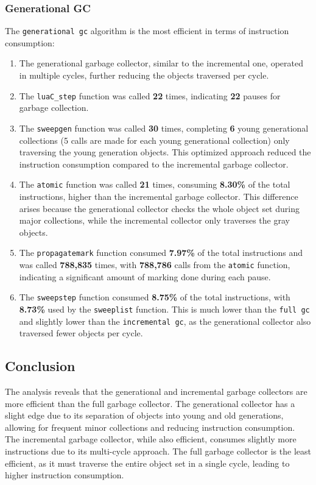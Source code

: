 \documentclass[10pt]{article}
\begin{document}
\subsubsection{Generational GC}
The \texttt{generational gc} algorithm is the most efficient in terms of instruction consumption:
\begin{enumerate}
    \item The generational garbage collector, similar to the incremental one, operated in multiple cycles, further reducing the objects traversed per cycle.
    \item The \texttt{luaC\_step} function was called \textbf{22} times, indicating \textbf{22} pauses for garbage collection.
    \item The \texttt{sweepgen} function was called \textbf{30} times, completing \textbf{6} young generational collections (5 calls are made for each young generational collection) only traversing the young generation objects. This optimized approach reduced the instruction consumption compared to the incremental garbage collector.
    \item The \texttt{atomic} function was called \textbf{21} times, consuming \textbf{8.30\%} of the total instructions, higher than the incremental garbage collector. This difference arises because the generational collector checks the whole object set during major collections, while the incremental collector only traverses the gray objects.
    \item The \texttt{propagatemark} function consumed \textbf{7.97\%} of the total instructions and was called \textbf{788,835} times, with \textbf{788,786} calls from the \texttt{atomic} function, indicating a significant amount of marking done during each pause.
    \item The \texttt{sweepstep} function consumed \textbf{8.75\%} of the total instructions, with \textbf{8.73\%} used by the \texttt{sweeplist} function. This is much lower than the \texttt{full gc} and slightly lower than the \texttt{incremental gc}, as the generational collector also traversed fewer objects per cycle.
\end{enumerate}

\subsection{Conclusion}
The analysis reveals that the generational and incremental garbage collectors are more efficient than the full garbage collector. The generational collector has a slight edge due to its separation of objects into young and old generations, allowing for frequent minor collections and reducing instruction consumption. The incremental garbage collector, while also efficient, consumes slightly more instructions due to its multi-cycle approach. The full garbage collector is the least efficient, as it must traverse the entire object set in a single cycle, leading to higher instruction consumption.
\end{document}
